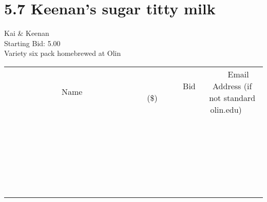 \documentclass[11pt]{article}
\begin{document}
					\section*{5.7 Keenan's sugar titty milk}
					Kai \& Keenan \\
					Starting Bid: 5.00 \\
					Variety six pack homebrewed at Olin \\
					[6ex]
					\begin{tabular}{c c c}
						~~~~~~~~~~~~~Name~~~~~~~~~~~~~ & ~~~~~~~~~Bid (\$)~~~~~~~~~ & ~~~Email Address (if not standard olin.edu)~~~ \\
				
 & & \\
\hline
 & & \\
\hline
 & & \\
\hline
 & & \\
\hline
 & & \\
\hline
 & & \\
\hline
 & & \\
\hline
 & & \\
\hline
 & & \\
\hline
 & & \\
\hline
 & & \\
\hline
 & & \\
\hline
 & & \\
\hline
 & & \\
\hline
 & & \\
\hline
 & & \\
\hline
 & & \\
\hline
 & & \\
\hline
 & & \\
\hline
 & & \\
\hline
 & & \\
\hline
 & & \\
\hline
 & & \\
\hline
 & & \\
\hline
 & & \\
\hline
 & & \\
\hline
					\end{tabular}
					\clearpage
				
\end{document}
